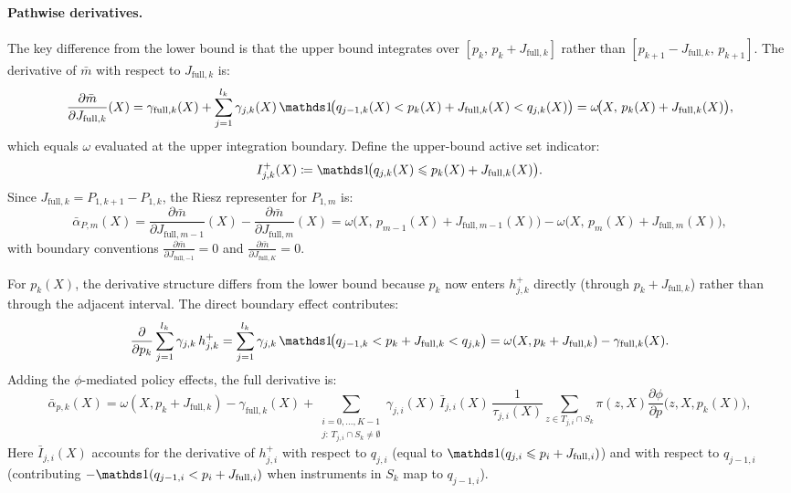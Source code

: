 \paragraph{Pathwise derivatives.} The key difference from the lower bound is that the upper bound integrates over $[p_k,\,p_k + J_{\mathrm{full},k}]$ rather than $[p_{k+1} - J_{\mathrm{full},k},\,p_{k+1}]$. The derivative of $\bar{m}$ with respect to $J_{\mathrm{full},k}$ is:
\begin{equation*}
    \frac{\partial \bar{m}}{\partial J_{\mathrm{full},k}}(X) = \gamma_{\mathrm{full},k}(X) + \sum_{j=1}^{l_k}\gamma_{j,k}(X)\,\indicator\!\big(q_{j-1,k}(X) < p_k(X) + J_{\mathrm{full},k}(X) < q_{j,k}(X)\big) = \omega\!\big(X,\,p_k(X) + J_{\mathrm{full},k}(X)\big),
\end{equation*}
which equals $\omega$ evaluated at the upper integration boundary. Define the upper-bound active set indicator:
\begin{equation*}
    I_{j,k}^+(X) \coloneqq \indicator\!\big(q_{j,k}(X) \leqslant p_k(X) + J_{\mathrm{full},k}(X)\big).
\end{equation*}
Since $J_{\mathrm{full},k} = P_{1,k+1} - P_{1,k}$, the Riesz representer for $P_{1,m}$ is:
\begin{equation*}
    \bar{\alpha}_{P,m}(X) = \frac{\partial \bar{m}}{\partial J_{\mathrm{full},m-1}}(X) - \frac{\partial \bar{m}}{\partial J_{\mathrm{full},m}}(X) = \omega\!\big(X,\,p_{m-1}(X) + J_{\mathrm{full},m-1}(X)\big) - \omega\!\big(X,\,p_m(X) + J_{\mathrm{full},m}(X)\big),
\end{equation*}
with boundary conventions $\frac{\partial \bar{m}}{\partial J_{\mathrm{full},-1}} = 0$ and $\frac{\partial \bar{m}}{\partial J_{\mathrm{full},K}} = 0$.

For $p_k(X)$, the derivative structure differs from the lower bound because $p_k$ now enters $h_{j,k}^+$ directly (through $p_k + J_{\mathrm{full},k}$) rather than through the adjacent interval. The direct boundary effect contributes:
\begin{equation*}
    \frac{\partial}{\partial p_k}\sum_{j=1}^{l_k}\gamma_{j,k}\,h_{j,k}^+ = \sum_{j=1}^{l_k}\gamma_{j,k}\,\indicator\!\big(q_{j-1,k} < p_k + J_{\mathrm{full},k} < q_{j,k}\big) = \omega(X, p_k + J_{\mathrm{full},k}) - \gamma_{\mathrm{full},k}(X).
\end{equation*}
Adding the $\phi$-mediated policy effects, the full derivative is:
\begin{equation*}
    \bar{\alpha}_{p,k}(X) = \omega(X,p_k + J_{\mathrm{full},k}) - \gamma_{\mathrm{full},k}(X) + \sum_{\substack{i=0,\ldots,K-1 \\ j:\,T_{j,i}\cap S_k \neq \emptyset}} \gamma_{j,i}(X)\,\bar{I}_{j,i}(X)\,
    \frac{1}{\tau_{j,i}(X)}\sum_{z\in T_{j,i}\cap S_k}\pi(z,X)\frac{\partial\phi}{\partial p}\big(z,X,p_k(X)\big),
\end{equation*}
Here $\bar{I}_{j,i}(X)$ accounts for the derivative of $h_{j,i}^+$ with respect to $q_{j,i}$ (equal to $\indicator(q_{j,i} \leqslant p_i + J_{\mathrm{full},i})$) and with respect to $q_{j-1,i}$ (contributing $-\indicator(q_{j-1,i} < p_i + J_{\mathrm{full},i})$ when instruments in $S_k$ map to $q_{j-1,i}$).

